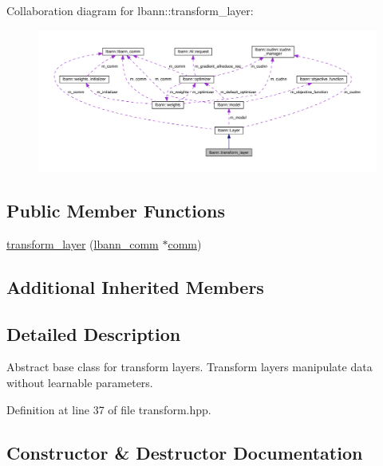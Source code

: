 Collaboration diagram for lbann\+:\+:transform\+\_\+layer\+:\nopagebreak
\begin{figure}[H]
\begin{center}
\leavevmode
\includegraphics[width=350pt]{classlbann_1_1transform__layer__coll__graph}
\end{center}
\end{figure}
\subsection*{Public Member Functions}
\begin{DoxyCompactItemize}
\item 
\hyperlink{classlbann_1_1transform__layer_a4b72501e0f4d0745c8b13c5331055e65}{transform\+\_\+layer} (\hyperlink{classlbann_1_1lbann__comm}{lbann\+\_\+comm} $\ast$\hyperlink{file__io_8cpp_ab048c6f9fcbcfaa57ce68b00263dbebe}{comm})
\end{DoxyCompactItemize}
\subsection*{Additional Inherited Members}


\subsection{Detailed Description}
Abstract base class for transform layers. Transform layers manipulate data without learnable parameters. 

Definition at line 37 of file transform.\+hpp.



\subsection{Constructor \& Destructor Documentation}
\mbox{\label{classlbann_1_1transform__layer_a4b72501e0f4d0745c8b13c5331055e65}} 
